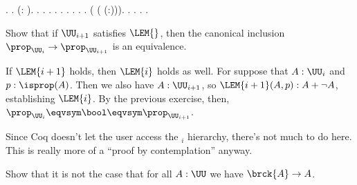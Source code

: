 \begin{coqdoccode}
\coqdocindent{2.00em}
 . .\coqdoceol
\coqdocindent{2.00em}
 (\coqdocnotation{(}:\coqdocnotation{)} \coqdocnotation{=} ).\coqdoceol
\coqdocindent{3.00em}
 .  .\coqdoceol
\coqdocindent{4.00em}
 . .\coqdoceol
\coqdocindent{4.00em}
 . .\coqdoceol
\coqdocindent{2.00em}
\coqdoctac{\ensuremath{\exists}} .  . .\coqdoceol
\coqdocindent{2.00em}
 ( ( (:))).  .  .\coqdoceol
\coqdocnoindent
{}.\coqdoceol
\coqdocemptyline
\coqdocnoindent
{} .\coqdoceol
\coqdocemptyline
\end{coqdoccode}
Show that if $\UU_{i+1}$ satisfies $\LEM{}$, then the canonical inclusion
$\prop_{\UU_{i}} \to \prop_{\UU_{i+1}}$ is an equivalence.


 \soln
If $\LEM{i+1}$ holds, then $\LEM{i}$ holds as well.  For suppose that
$A : \UU_{i}$ and $p : \isprop(A)$.  Then we also have $A :
\UU_{i+1}$, so $\LEM{i+1}(A, p) : A + \lnot A$, establishing
$\LEM{i}$.  By the previous exercise, then, $\prop_{\UU_{i}} \eqvsym
\bool \eqvsym \prop_{\UU_{i+1}}$.


Since Coq doesn't let the user access the ${}_{i}$ hierarchy,
there's not much to do here.  This is really more of a ``proof by
contemplation'' anyway.


Show that it is not the case that for all $A : \UU$ we have $\brck{A} \to A$.



